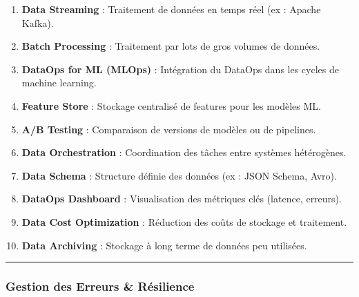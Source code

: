 \documentclass[
  letterpaper,
  DIV=11,
  numbers=noendperiod]{scrartcl}
\providecommand{\tightlist}{%
  \setlength{\itemsep}{0pt}\setlength{\parskip}{0pt}}\usepackage{longtable,booktabs,array}
\begin{document}
\begin{enumerate}
\def\labelenumi{\arabic{enumi}.}
\setcounter{enumi}{50}
\tightlist
\item
  \textbf{Data Streaming} : Traitement de données en temps réel (ex :
  Apache Kafka).\\
\item
  \textbf{Batch Processing} : Traitement par lots de gros volumes de
  données.\\
\item
  \textbf{DataOps for ML (MLOps)} : Intégration du DataOps dans les
  cycles de machine learning.\\
\item
  \textbf{Feature Store} : Stockage centralisé de features pour les
  modèles ML.\\
\item
  \textbf{A/B Testing} : Comparaison de versions de modèles ou de
  pipelines.\\
\item
  \textbf{Data Orchestration} : Coordination des tâches entre systèmes
  hétérogènes.\\
\item
  \textbf{Data Schema} : Structure définie des données (ex : JSON
  Schema, Avro).\\
\item
  \textbf{DataOps Dashboard} : Visualisation des métriques clés
  (latence, erreurs).\\
\item
  \textbf{Data Cost Optimization} : Réduction des coûts de stockage et
  traitement.\\
\item
  \textbf{Data Archiving} : Stockage à long terme de données peu
  utilisées.
\end{enumerate}

\begin{center}\rule{0.5\linewidth}{0.5pt}\end{center}

\subsubsection{\texorpdfstring{\textbf{Gestion des Erreurs \&
Résilience}}{Gestion des Erreurs \& Résilience}}\label{gestion-des-erreurs-ruxe9silience}
\end{document}
